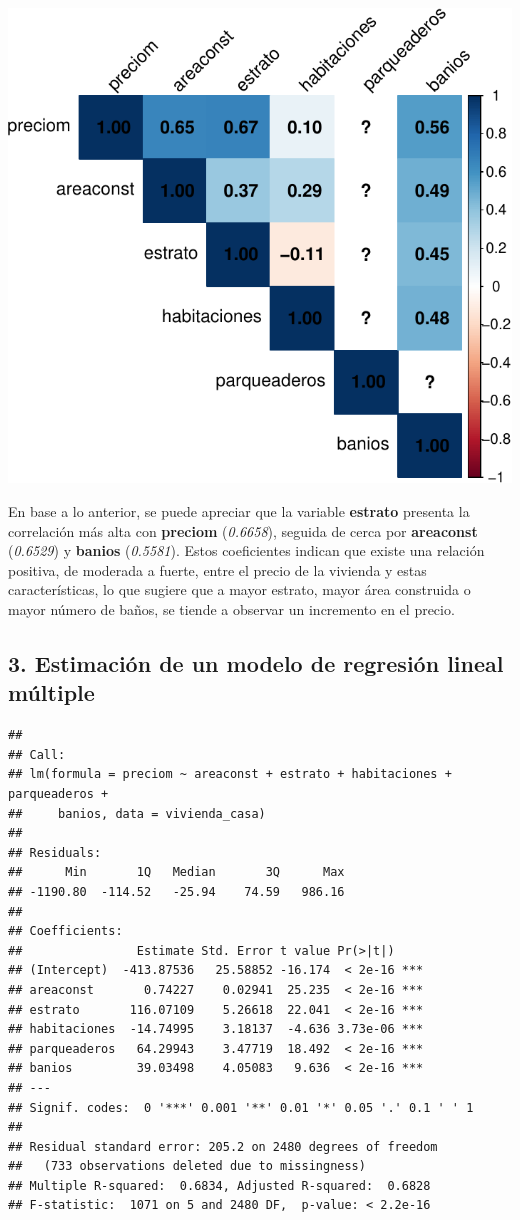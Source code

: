 \documentclass[
]{article}
\begin{document}
\includegraphics{A2_U2_InformeEjecutivo_files/figure-latex/unnamed-chunk-15-2.pdf}

En base a lo anterior, se puede apreciar que la variable
\textbf{estrato} presenta la correlación más alta con \textbf{preciom}
(\emph{0.6658}), seguida de cerca por \textbf{areaconst} (\emph{0.6529})
y \textbf{banios} (\emph{0.5581}). Estos coeficientes indican que existe
una relación positiva, de moderada a fuerte, entre el precio de la
vivienda y estas características, lo que sugiere que a mayor estrato,
mayor área construida o mayor número de baños, se tiende a observar un
incremento en el precio.

\subsection{\texorpdfstring{\textbf{3. Estimación de un modelo de
regresión lineal
múltiple}}{3. Estimación de un modelo de regresión lineal múltiple}}\label{estimaciuxf3n-de-un-modelo-de-regresiuxf3n-lineal-muxfaltiple}

\begin{verbatim}
## 
## Call:
## lm(formula = preciom ~ areaconst + estrato + habitaciones + parqueaderos + 
##     banios, data = vivienda_casa)
## 
## Residuals:
##      Min       1Q   Median       3Q      Max 
## -1190.80  -114.52   -25.94    74.59   986.16 
## 
## Coefficients:
##                Estimate Std. Error t value Pr(>|t|)    
## (Intercept)  -413.87536   25.58852 -16.174  < 2e-16 ***
## areaconst       0.74227    0.02941  25.235  < 2e-16 ***
## estrato       116.07109    5.26618  22.041  < 2e-16 ***
## habitaciones  -14.74995    3.18137  -4.636 3.73e-06 ***
## parqueaderos   64.29943    3.47719  18.492  < 2e-16 ***
## banios         39.03498    4.05083   9.636  < 2e-16 ***
## ---
## Signif. codes:  0 '***' 0.001 '**' 0.01 '*' 0.05 '.' 0.1 ' ' 1
## 
## Residual standard error: 205.2 on 2480 degrees of freedom
##   (733 observations deleted due to missingness)
## Multiple R-squared:  0.6834, Adjusted R-squared:  0.6828 
## F-statistic:  1071 on 5 and 2480 DF,  p-value: < 2.2e-16
\end{verbatim}
\end{document}
